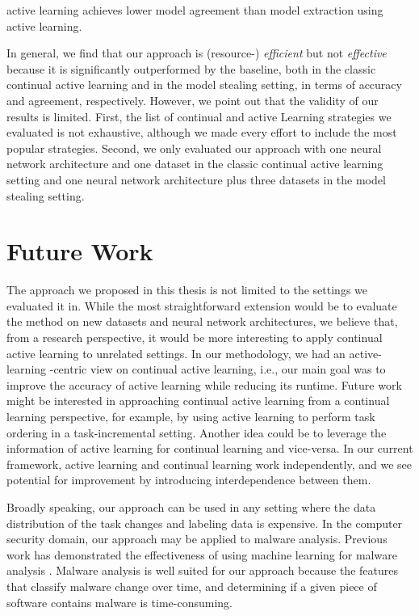 active learning achieves lower model agreement than model extraction using active learning. \par
In general, we find that our approach is (resource-) \textit{efficient} but not \textit{effective} because it is significantly outperformed
by the baseline, both in the classic continual active learning and in the model stealing setting, in terms of accuracy and agreement,
respectively. However, we point out that the validity of our results is limited. First, the list of continual and active Learning
strategies we evaluated is not exhaustive, although we made every effort to include the most popular strategies. Second, we only evaluated our
approach with one neural network architecture and one dataset in the classic continual active learning setting and one neural network architecture
plus three datasets in the model stealing setting.
\section{Future Work}
\label{sec:Conclusion:FutureWork}
The approach we proposed in this thesis is not limited to the settings we evaluated it in. While the most straightforward extension would
be to evaluate the method on new datasets and neural network architectures, we believe that, from a research
perspective, it would be more interesting to apply continual active learning to unrelated settings. In our methodology, we had an active-learning
-centric view on continual active learning, i.e., our main goal was to improve the accuracy of active learning while reducing its runtime. Future
work might be interested in approaching continual active learning from a continual learning perspective, for example, by using active learning to
perform task ordering in a task-incremental setting. Another idea could be to leverage the information of active learning for continual learning
and vice-versa. In our current framework, active learning and continual learning work independently, and we see potential for improvement by 
introducing interdependence between them. \par
Broadly speaking, our approach can be used in any setting where the data distribution of the task changes and labeling data is expensive.
In the computer security domain, our approach may be applied to malware analysis. Previous work has demonstrated the effectiveness of using
machine learning for malware analysis \parencite{nath2014static,ijaz2019static}. Malware analysis is well suited for our approach
because the features that classify malware change over time, and determining if a given piece of software contains malware is time-consuming.